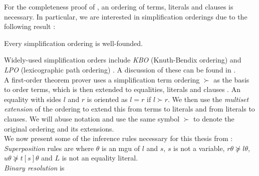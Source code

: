 For the completeness proof of \Sup, an ordering of terms, literals and clauses is necessary. In particular, we are interested in simplification orderings due to the following result \cite{baader_nipkow_1998}:
\begin{theorem}
	Every simplification ordering is well-founded.
\end{theorem}
Widely-used simplification orders include \textit{KBO} (Knuth-Bendix ordering) \cite{kbo} and \textit{LPO} (lexicographic path ordering) \cite{lpo}. A discussion of these can be found in \cite{dershowitz1982}.\medskip\\
A first-order theorem prover uses a simplification term ordering $\succ$ as the basis to order terms, which is then extended to equalities, literals and clauses \cite{superpositionproof}. An equality with sides $l$ and $r$ is oriented as $l=r$ if $l\succ r$. We then use the \textit{multiset extension} of the ordering to extend this from terms to literals and from literals to clauses. We will abuse notation and use the same symbol $\succ$ to denote the original ordering and its extensions.\medskip\\
We now present some of the inference rules necessary for this thesis from \Sup:\medskip\\
\textit{Superposition} rules are
where $\theta$ is an mgu of $l$ and $s$, $s$ is not a variable, $r\theta\not\succeq l\theta$, $u\theta\not\succeq t[s]\theta$ and $L$ is not an equality literal.\medskip\\
\textit{Binary resolution} is
